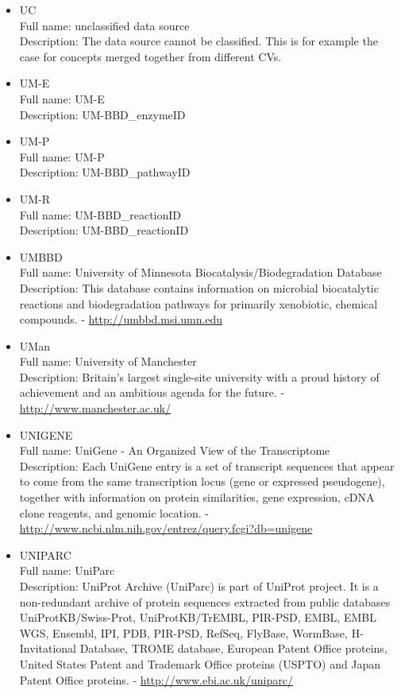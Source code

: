 \begin{itemize}
\item{UC}\\ Full name: unclassified data source\\ Description: The data source cannot be classified. This is for example the case for concepts merged together from different CVs. 

\item{UM-E}\\ Full name: UM-E\\ Description: UM-BBD\_enzymeID 

\item{UM-P}\\ Full name: UM-P\\ Description: UM-BBD\_pathwayID 

\item{UM-R}\\ Full name: UM-BBD\_reactionID\\ Description: UM-BBD\_reactionID 

\item{UMBBD}\\ Full name: University of Minnesota Biocatalysis/Biodegradation Database\\ Description: This database contains information on microbial biocatalytic reactions and biodegradation pathways for primarily xenobiotic, chemical compounds. - 
\url{http://umbbd.msi.umn.edu}

\item{UMan}\\ Full name: University of Manchester\\ Description: Britain's largest single-site university with a proud history of achievement and an ambitious agenda for the future. - 
\url{http://www.manchester.ac.uk/}

\item{UNIGENE}\\ Full name: UniGene - An Organized View of the Transcriptome\\ Description: Each UniGene entry is a set of transcript sequences that appear to come from the same transcription locus (gene or expressed pseudogene), together with information on protein similarities, gene expression, cDNA clone reagents, and genomic location. - 
\url{http://www.ncbi.nlm.nih.gov/entrez/query.fcgi?db=unigene}

\item{UNIPARC}\\ Full name: UniParc\\ Description: UniProt Archive (UniParc) is part of UniProt project. It is a non-redundant archive of protein sequences extracted from public databases UniProtKB/Swiss-Prot, UniProtKB/TrEMBL, PIR-PSD, EMBL, EMBL WGS, Ensembl, IPI, PDB, PIR-PSD, RefSeq, FlyBase, WormBase, H-Invitational Database, TROME database, European Patent Office proteins, United States Patent and Trademark Office proteins (USPTO) and Japan Patent Office proteins. - 
\url{http://www.ebi.ac.uk/uniparc/}


\end{itemize}
